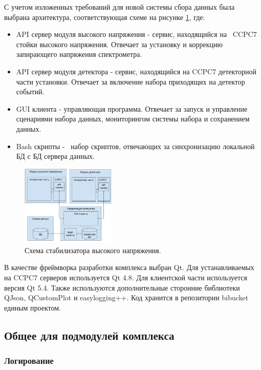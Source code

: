\documentclass[a4paper,14pt]{extreport}
\begin{document}
С учетом изложенных требований для новой системы сбора данных была выбрана архитектура, соответствующая схеме на рисунке \ref{fig:numass-new-system}, где:

\begin{itemize}
        \item API сервер модуля высокого напряжения - сервис, находящийся на \ CCPC7 стойки высокого напряжения. Отвечает за установку и коррекцию запирающего напряжения спектрометра.
        \item API сервер модуля детектора - сервис, находящийся на CCPC7 детекторной части установки. Отвечает за включение набора приходящих на детектор событий.
        \item GUI клиента - управляющая программа. Отвечает за запуск и управление сценариями набора данных, мониторингом системы набора и сохранением данных.
        \item Bash скрипты - \ набор скриптов, отвечающих за синхронизацию локальной БД с БД сервера данных.
        \end{itemize}

\begin{figure}
  \centering
  \includegraphics[width = 0.4\textwidth]{img/nu_mass_setup/new_system.pdf}
    \caption{Схема стабилизатора высокого напряжения.
    }
    \label{fig:numass-new-system}
\end{figure}

В качестве фреймворка разработки комплекса выбран Qt. Для устанавливаемых на CCPC7 серверов используется Qt 4.8. Для клиентской части используется версия Qt 5.4. Также используются дополнительные сторонние библиотеки QJson, QCustomPlot и easylogging++. Код хранится в репозитории bibucket единым проектом.


\subsection{Общее для подмодулей комплекса}

\subsubsection{Логирование}
\end{document}
